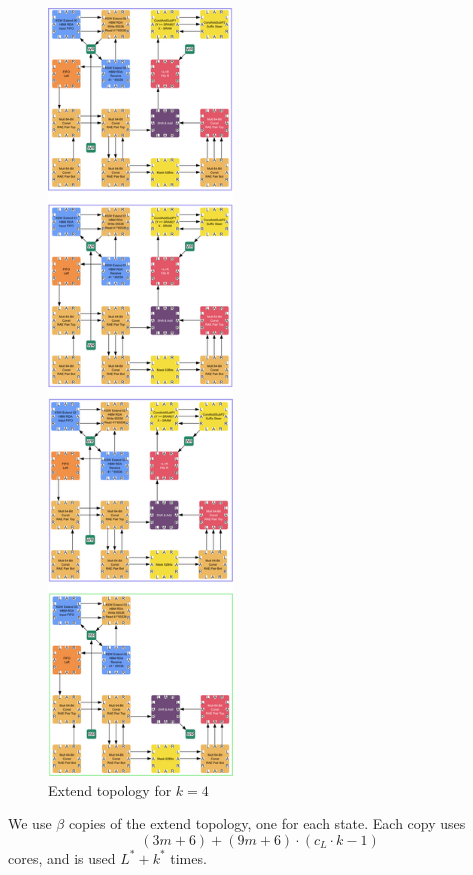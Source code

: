 \documentclass[../../fheimpl.tex]{subfiles}
\begin{document}
	\begin{figure}[H]
		\includegraphics[width=\textwidth,height=8in,keepaspectratio]{graphics/extend.png}
		\caption{Extend topology for $k=4$}
		\label{fig:extendtopo}
	\end{figure}
	
	We use $\beta$ copies of the extend topology, one for each state. Each copy uses
	\[(3m+6)+(9m+6)\cdot(c_L\cdot k-1)\]
	cores, and is used $L^*+k^*$ times.
	
\end{document}

